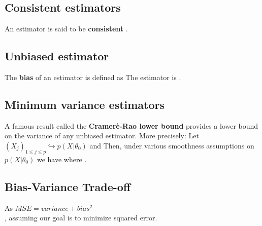 \subsection{Consistent estimators}
An estimator is said to be \textbf{consistent} . 

\subsection{Unbiased estimator}
The \textbf{bias} of an estimator is defined as 
The estimator is .

\subsection{Minimum variance estimators}
A famous result called the \textbf{Cramerè-Rao lower bound} provides a lower bound on the
variance of any unbiased estimator. More precisely:
Let $\left(X_{j}\right)_{1 \leq j \leq p} \hookrightarrow p(X|\theta_{0})$ and 
Then, under various smoothness assumptions on $p(X|\theta_{0})$ we have  
where .

\subsection{Bias-Variance Trade-off} 
As $MSE = variance + bias^{2}$\\
,
assuming our goal is to minimize squared error. 
